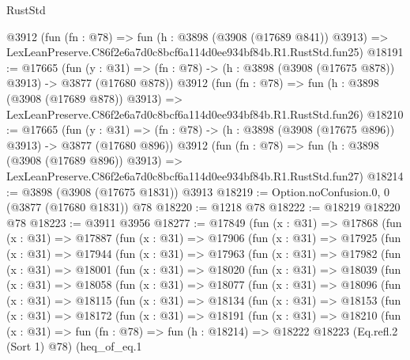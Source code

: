 \begin{lexlean}{RustStd}
\begin{coremodule}
    @3912
    (fun (fn : @78) =>
    fun (h : @3898 (@3908 (@17689 @841)) @3913) =>
    LexLeanPreserve.C86f2e6a7d0c8bcf6a114d0ee934bf84b.R1.RustStd.fun25)
@18191 := @17665
    (fun (y : @31) => (fn : @78) -> (h : @3898 (@3908 (@17675 @878)) @3913) -> @3877 (@17680 @878))
    @3912
    (fun (fn : @78) =>
    fun (h : @3898 (@3908 (@17689 @878)) @3913) =>
    LexLeanPreserve.C86f2e6a7d0c8bcf6a114d0ee934bf84b.R1.RustStd.fun26)
@18210 := @17665
    (fun (y : @31) => (fn : @78) -> (h : @3898 (@3908 (@17675 @896)) @3913) -> @3877 (@17680 @896))
    @3912
    (fun (fn : @78) =>
    fun (h : @3898 (@3908 (@17689 @896)) @3913) =>
    LexLeanPreserve.C86f2e6a7d0c8bcf6a114d0ee934bf84b.R1.RustStd.fun27)
@18214 := @3898 (@3908 (@17675 @1831)) @3913
@18219 := Option.noConfusion.{0, 0} (@3877 (@17680 @1831)) @78
@18220 := @1218 @78
@18222 := @18219 @18220 @78
@18223 := @3911 @3956
@18277 := @17849
    (fun (x : @31) =>
    @17868
      (fun (x : @31) =>
      @17887
        (fun (x : @31) =>
        @17906
          (fun (x : @31) =>
          @17925
            (fun (x : @31) =>
            @17944
              (fun (x : @31) =>
              @17963
                (fun (x : @31) =>
                @17982
                  (fun (x : @31) =>
                  @18001
                    (fun (x : @31) =>
                    @18020
                      (fun (x : @31) =>
                      @18039
                        (fun (x : @31) =>
                        @18058
                          (fun (x : @31) =>
                          @18077
                            (fun (x : @31) =>
                            @18096
                              (fun (x : @31) =>
                              @18115
                                (fun (x : @31) =>
                                @18134
                                  (fun (x : @31) =>
                                  @18153
                                    (fun (x : @31) =>
                                    @18172
                                      (fun (x : @31) =>
                                      @18191
                                        (fun (x : @31) =>
                                        @18210
                                          (fun (x : @31) =>
                                          fun (fn : @78) =>
                                          fun (h : @18214) =>
                                          @18222
                                            @18223
                                            (Eq.refl.{2} (Sort 1) @78)
                                            (heq_of_eq.{1}

\end{coremodule}
\end{lexlean}
